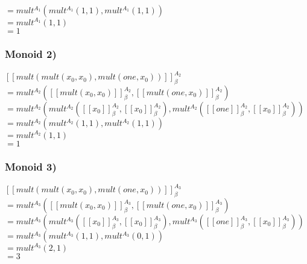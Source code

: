$= mult^{A_1}(mult^{A_1}(1 , 1), mult^{A_1}( 1 , 1 )) $\\

$= mult^{A_1}(1, 1)$\\

$= 1$\\

\subsubsection*{Monoid 2)}

$[[mult(mult(x_0 ,x_0), mult(one,x_0 )) ]]^{A_2}_{\beta}$\\

$= mult^{A_2}([[mult(x_0 ,x_0)]]^{A_2}_{\beta}, [[mult(one,x_0 ) ]]^{A_2}_{\beta})$\\

$= mult^{A_2}(
mult^{A_2}(
[[x_0 ]]^{A_2}_{\beta} , [[x_0 ]]^{A_2}_{\beta}
), mult^{A_2}( 
[[one]]^{A_2}_{\beta} , [[x_0]]^{A_2}_{\beta} )) $\\

$= mult^{A_2}(mult^{A_2}(1 , 1), mult^{A_2}( 1 , 1 )) $\\

$= mult^{A_2}(1, 1)$\\

$= 1$\\

\subsubsection*{Monoid 3)}

$[[mult(mult(x_0 ,x_0), mult(one,x_0 )) ]]^{A_3}_{\beta}$\\

$= mult^{A_3}([[mult(x_0 ,x_0)]]^{A_3}_{\beta}, [[mult(one,x_0 ) ]]^{A_3}_{\beta})$\\

$= mult^{A_3}(
mult^{A_3}(
[[x_0 ]]^{A_3}_{\beta} , [[x_0 ]]^{A_3}_{\beta}
), mult^{A_3}( 
[[one]]^{A_3}_{\beta} , [[x_0]]^{A_3}_{\beta} )) $\\

$= mult^{A_3}(mult^{A_3}(1 , 1), mult^{A_3}( 0 , 1 )) $\\

$= mult^{A_3}(2, 1)$\\

$= 3$\\